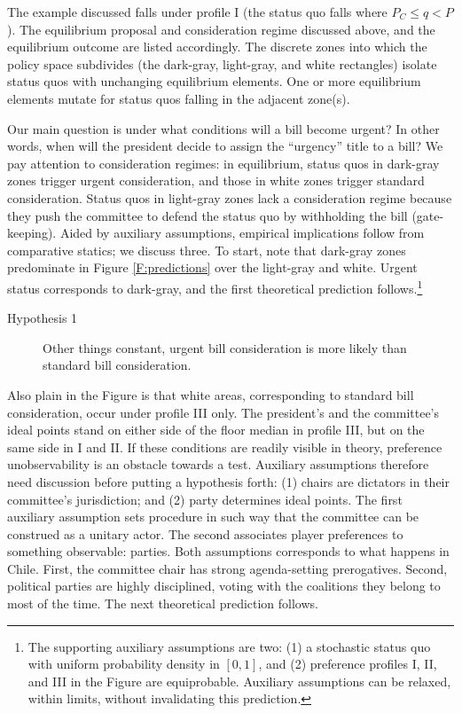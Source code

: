 \documentclass[letter,12pt]{article}
\begin{document}
The example discussed falls under profile I (the status quo falls where $P_C \leq q < P$). The equilibrium proposal and consideration regime discussed above, and the equilibrium outcome are listed accordingly. The discrete zones into which the policy space subdivides (the dark-gray, light-gray, and white rectangles) isolate status quos with unchanging equilibrium elements. One or more equilibrium elements mutate for status quos falling in the adjacent zone(s).

Our main question is under what conditions will a bill become urgent?  In other words, when will the president decide to assign the ``urgency'' title to a bill?  We pay attention to consideration regimes: in equilibrium, status quos in dark-gray zones trigger urgent consideration, and those in white zones trigger standard consideration. Status quos in light-gray zones lack a consideration regime because they push the committee to defend the status quo by withholding the bill (gate-keeping). Aided by auxiliary assumptions, empirical implications follow from comparative statics; we discuss three. To start, note that dark-gray zones predominate in Figure \ref{F:predictions} over the light-gray and white. Urgent status corresponds to dark-gray, and the first theoretical prediction follows.\footnote{The supporting auxiliary assumptions are two: (1) a stochastic status quo with uniform probability density in $[0,1]$, and (2) preference profiles I, II, and III in the Figure are equiprobable. Auxiliary assumptions can be relaxed, within limits, without invalidating this prediction.}

\begin{description}
  \item [Hypothesis 1] Other things constant, urgent bill consideration is more likely than standard bill consideration. 
\end{description}
    
Also plain in the Figure is that white areas, corresponding to standard bill consideration, occur under profile III only. The president's and the committee's ideal points stand on either side of the floor median in profile III, but on the same side in I and II. If these conditions are readily visible in theory, preference unobservability is an obstacle towards a test. Auxiliary assumptions therefore need discussion before putting a hypothesis forth: (1) chairs are dictators in their committee's jurisdiction; and (2) party determines ideal points. The first auxiliary assumption sets procedure in such way that the committee can be construed as a unitary actor. The second associates player preferences to something observable: parties. Both assumptions corresponds to what happens in Chile. First, the committee chair has strong agenda-setting prerogatives. Second, political parties are highly disciplined, voting with the coalitions they belong to most of the time.
The next theoretical prediction follows. 
\end{document}
